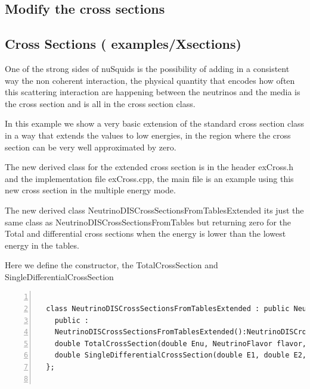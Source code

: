 \subsection{Modify the cross sections}

\subsection{ Cross Sections \textnormal{({\ttf
      examples/Xsections})}}

One of the strong sides of nuSquids is the possibility of adding in a
consistent way the non coherent interaction, the physical quantity
that encodes how often this scattering interaction are happening
between the neutrinos and the media is the cross section and is all in
the cross section class.

In this example we show a very basic extension of the standard
cross section class in a way that extends the values to low energies, 
in the region where the cross section can be very well approximated by
zero.

The new derived class for the extended cross section is in the header
{\ttf exCross.h} and the implementation file {\ttf exCross.cpp}, the
main file is an example using this new cross section in the multiple
energy mode.

The new derived class {\ttf
  NeutrinoDISCrossSectionsFromTablesExtended} its just the same class
as {\ttf NeutrinoDISCrossSectionsFromTables} but returning zero for
the Total and differential cross sections when the energy is lower
than the lowest energy in the tables.

Here we define the constructor, the {\ttf TotalCrossSection} and {\ttf SingleDifferentialCrossSection}
\begin{lstlisting}[frame=leftline, numbers =
  left,breaklines=true,label = ex:sin1]
  
  class NeutrinoDISCrossSectionsFromTablesExtended : public NeutrinoDISCrossSectionsFromTables {
    public :
    NeutrinoDISCrossSectionsFromTablesExtended():NeutrinoDISCrossSectionsFromTables(){}
    double TotalCrossSection(double Enu, NeutrinoFlavor flavor, NeutrinoType neutype, Current current) const override;
    double SingleDifferentialCrossSection(double E1, double E2, NeutrinoFlavor flavor, NeutrinoType neutype, Current current) const override;
  };
 
\end{lstlisting}

